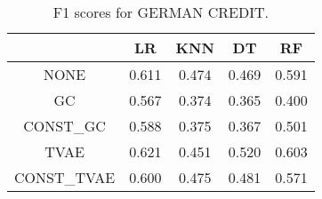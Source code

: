\begin{table}
\caption{F1 scores for GERMAN CREDIT.}
\label{tab:f1-GERMAN CREDIT}
\begin{tabular}{ccccc}
\toprule
 & LR & KNN & DT & RF \\
\midrule
NONE & 0.611 & 0.474 & 0.469 & 0.591 \\
GC & 0.567 & 0.374 & 0.365 & 0.400 \\
CONST\_GC & 0.588 & 0.375 & 0.367 & 0.501 \\
TVAE & 0.621 & 0.451 & 0.520 & 0.603 \\
CONST\_TVAE & 0.600 & 0.475 & 0.481 & 0.571 \\
\bottomrule
\end{tabular}
\end{table}
